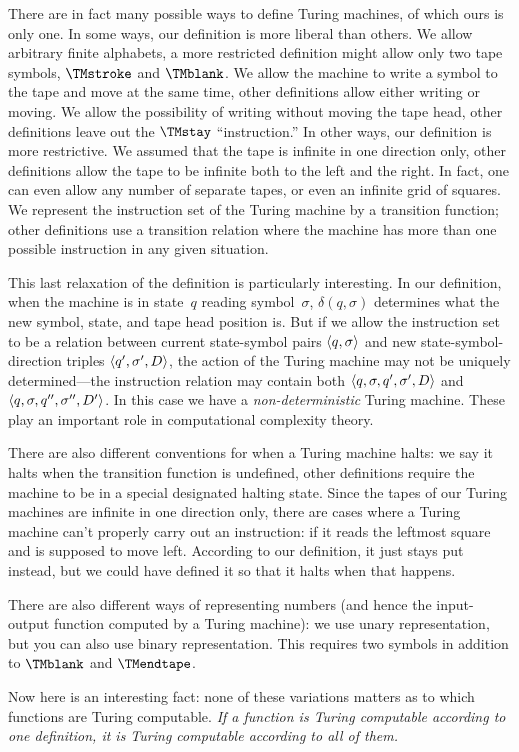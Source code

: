 \documentclass[../../../include/open-logic-section]{subfiles}
\begin{document}

There are in fact many possible ways to define Turing machines, of
which ours is only one.  In some ways, our definition is more liberal
than others. We allow arbitrary finite alphabets, a more restricted
definition might allow only two tape symbols, $\TMstroke$ and
$\TMblank$.  We allow the machine to write a symbol to the tape and
move at the same time, other definitions allow either writing or
moving.  We allow the possibility of writing without moving the tape
head, other definitions leave out the $\TMstay$ ``instruction.''  In
other ways, our definition is more restrictive. We assumed that the
tape is infinite in one direction only, other definitions allow the
tape to be infinite both to the left and the right. In fact, one can
even allow any number of separate tapes, or even an infinite grid
of squares.  We represent the instruction set of the Turing machine by
a transition function; other definitions use a transition relation
where the machine has more than one possible instruction in any given
situation.

This last relaxation of the definition is particularly interesting.
In our definition, when the machine is in state~$q$ reading
symbol~$\sigma$, $\delta(q, \sigma)$ determines what the new symbol,
state, and tape head position is.  But if we allow the instruction set
to be a relation between current state-symbol pairs $\langle q,
  \sigma \rangle$ and new state-symbol-direction triples $\langle q', \sigma',
  D \rangle$, the action of the Turing machine may not be uniquely
determined---the instruction relation may contain both $\langle q,
  \sigma, q', \sigma', D \rangle$ and $\langle q, \sigma, q'', \sigma'', D' \rangle$.
In this case we have a \emph{non-deterministic} Turing machine.  These
play an important role in computational complexity theory.

There are also different conventions for when a Turing machine halts:
we say it halts when the transition function is undefined, other
definitions require the machine to be in a special designated halting
state. Since the tapes of our Turing machines are infinite in one
direction only, there are cases where a Turing machine can't properly
carry out an instruction: if it reads the leftmost square and is
supposed to move left. According to our definition, it just stays put
instead, but we could have defined it so that it halts when that
happens.

There are also different ways of representing numbers (and hence the
input-output function computed by a Turing machine): we use unary
representation, but you can also use binary representation. This
requires two symbols in addition to $\TMblank$ and $\TMendtape$.

Now here is an interesting fact: none of these variations matters as
to which functions are Turing computable. \emph{If a function is Turing
computable according to one definition, it is Turing computable
according to all of them.}  
\end{document}
